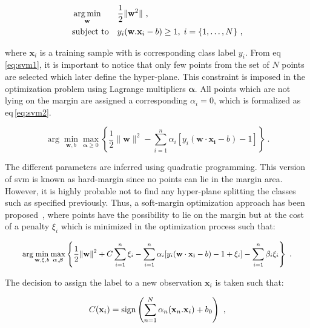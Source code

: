 \begin{enumerate}[leftmargin=*]
  \begin{equation}
    \begin{aligned}
      & \operatorname*{arg\,min}_{\mathbf{w}}
      & & \frac{1}{2} \| \mathbf{w}^2\| \ , \\
      & \text{subject to}
      & & y_i(\mathbf{w}.\mathbf{x}_i - b) \geq 1, \; i = \{ 1, \ldots, N \} \ ,
    \end{aligned}
    \label{eq:svm1}
  \end{equation}

  \noindent where $\mathbf{x}_i$ is a training sample with is corresponding
  class label $y_i$.
  From \acs{eq}\,\eqref{eq:svm1}, it is important to notice that only few
  points from the set of $N$ points are selected which later define the
  hyper-plane.
  This constraint is imposed in the optimization problem using Lagrange
  multipliers $\boldsymbol{\alpha}$.
  All points which are not lying on the margin are assigned a corresponding
  $\alpha_i = 0$, which is formalized as \acs{eq}\,\eqref{eq:svm2}.

  \begin{equation}
    \arg\min_{\mathbf{w},b } \max_{\boldsymbol{\alpha}\geq 0 } \left\{ \frac{1}{2}\|\mathbf{w}\|^2 - \sum_{i=1}^{n}{\alpha_i[y_i(\mathbf{w}\cdot \mathbf{x_i} - b)-1]} \right\} \ .
    \label{eq:svm2}
  \end{equation}

  The different parameters are inferred using quadratic programming.
  This version of \ac{svm} is known as hard-margin since no points can lie in
  the margin area.
  However, it is highly probable not to find any hyper-plane splitting the
  classes such as specified previously.
  Thus, a soft-margin optimization approach has been
  proposed~\cite{Cortes1995}, where points have the possibility to lie on the
  margin but at the cost of a penalty $\xi_i$ which is minimized in the
  optimization process such that:

  \begin{equation}
    \small
    \arg\min_{\mathbf{w},\mathbf{\xi}, b } \max_{\boldsymbol{\alpha},\boldsymbol{\beta} } \left\{ \frac{1}{2}\|\mathbf{w}\|^2+C \sum_{i=1}^n \xi_i - \sum_{i=1}^{n}{\alpha_i[y_i(\mathbf{w}\cdot \mathbf{x_i} - b) -1 + \xi_i]} - \sum_{i=1}^{n} \beta_i \xi_i \right\} \ .
  \end{equation}

  The decision to assign the label to a new observation $\mathbf{x}_i$ is taken
  such that:

  \begin{equation}
    C(\mathbf{x}_i) = \operatorname*{sign} \left( \sum_{n=1}^{N} \alpha_n (\mathbf{x}_n . \mathbf{x}_i) + b_0 \right) \ ,
    \label{eq:svmdec}
  \end{equation}


\end{enumerate}
